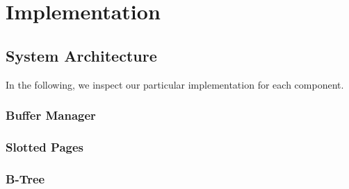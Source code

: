 \chapter{Implementation}


\section{System Architecture}

In the following, we inspect our particular implementation for each component.


\subsection*{Buffer Manager}



\subsection*{Slotted Pages}


\subsection*{B-Tree}

